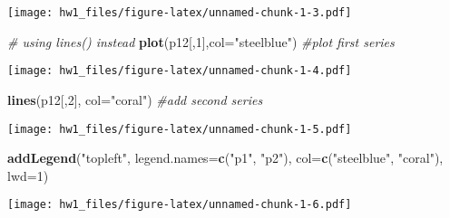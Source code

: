 \documentclass[
]{article}
\newenvironment{Shaded}{\begin{snugshade}}{\end{snugshade}}
\newcommand{\AttributeTok}[1]{\textcolor[rgb]{0.13,0.29,0.53}{#1}}
\newcommand{\CommentTok}[1]{\textcolor[rgb]{0.56,0.35,0.01}{\textit{#1}}}
\newcommand{\DecValTok}[1]{\textcolor[rgb]{0.00,0.00,0.81}{#1}}
\newcommand{\FunctionTok}[1]{\textcolor[rgb]{0.13,0.29,0.53}{\textbf{#1}}}
\newcommand{\NormalTok}[1]{#1}
\newcommand{\StringTok}[1]{\textcolor[rgb]{0.31,0.60,0.02}{#1}}
\begin{document}
\texttt{[image: hw1\_files/figure-latex/unnamed-chunk-1-3.pdf]}

\begin{Shaded}
\begin{Highlighting}[]
\CommentTok{\# using lines() instead}
\FunctionTok{plot}\NormalTok{(p12[,}\DecValTok{1}\NormalTok{],}\AttributeTok{col=}\StringTok{"steelblue"}\NormalTok{) }\CommentTok{\#plot first series}
\end{Highlighting}
\end{Shaded}

\texttt{[image: hw1\_files/figure-latex/unnamed-chunk-1-4.pdf]}

\begin{Shaded}
\begin{Highlighting}[]
\FunctionTok{lines}\NormalTok{(p12[,}\DecValTok{2}\NormalTok{], }\AttributeTok{col=}\StringTok{"coral"}\NormalTok{) }\CommentTok{\#add second series}
\end{Highlighting}
\end{Shaded}

\texttt{[image: hw1\_files/figure-latex/unnamed-chunk-1-5.pdf]}

\begin{Shaded}
\begin{Highlighting}[]
\FunctionTok{addLegend}\NormalTok{(}\StringTok{"topleft"}\NormalTok{, }\AttributeTok{legend.names=}\FunctionTok{c}\NormalTok{(}\StringTok{"p1"}\NormalTok{, }\StringTok{"p2"}\NormalTok{), }\AttributeTok{col=}\FunctionTok{c}\NormalTok{(}\StringTok{"steelblue"}\NormalTok{, }\StringTok{"coral"}\NormalTok{), }\AttributeTok{lwd=}\DecValTok{1}\NormalTok{)}
\end{Highlighting}
\end{Shaded}

\texttt{[image: hw1\_files/figure-latex/unnamed-chunk-1-6.pdf]}
\end{document}
